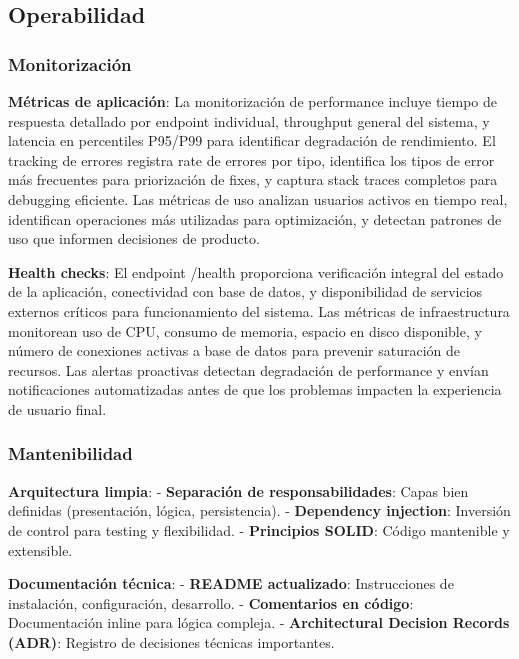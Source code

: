 \documentclass[12pt,a4paper,oneside]{report}
\begin{document}
\subsection{Operabilidad}\label{operabilidad}

\subsubsection{Monitorización}\label{monitorizaciuxf3n}

\textbf{Métricas de aplicación}: La monitorización de performance incluye tiempo de respuesta detallado por endpoint individual, throughput general del sistema, y latencia en percentiles P95/P99 para identificar degradación de rendimiento. El tracking de errores registra rate de errores por tipo, identifica los tipos de error más frecuentes para priorización de fixes, y captura stack traces completos para debugging eficiente. Las métricas de uso analizan usuarios activos en tiempo real, identifican operaciones más utilizadas para optimización, y detectan patrones de uso que informen decisiones de producto.

\textbf{Health checks}: El endpoint /health proporciona verificación integral del estado de la aplicación, conectividad con base de datos, y disponibilidad de servicios externos críticos para funcionamiento del sistema. Las métricas de infraestructura monitorean uso de CPU, consumo de memoria, espacio en disco disponible, y número de conexiones activas a base de datos para prevenir saturación de recursos. Las alertas proactivas detectan degradación de performance y envían notificaciones automatizadas antes de que los problemas impacten la experiencia de usuario final.

\subsubsection{Mantenibilidad}\label{mantenibilidad}

\textbf{Arquitectura limpia}: - \textbf{Separación de
responsabilidades}: Capas bien definidas (presentación, lógica,
persistencia). - \textbf{Dependency injection}: Inversión de control
para testing y flexibilidad. - \textbf{Principios SOLID}: Código
mantenible y extensible.

\textbf{Documentación técnica}: - \textbf{README actualizado}:
Instrucciones de instalación, configuración, desarrollo. -
\textbf{Comentarios en código}: Documentación inline para lógica
compleja. - \textbf{Architectural Decision Records (ADR)}: Registro de
decisiones técnicas importantes.
\end{document}
